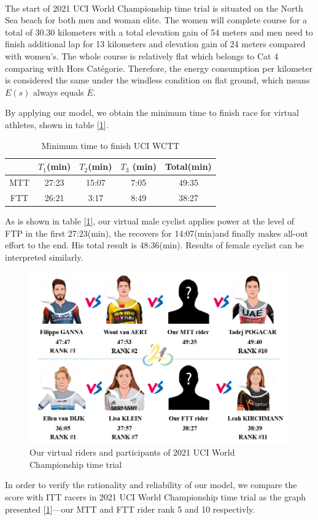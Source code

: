 \paragraph{} The start of 2021 UCI World Championship time trial is situated on the North Sea beach for both men and woman elite. The women will complete course for a total of 30.30 kilometers with a total elevation gain of 54 meters and men need to finish additional lap for 13 kilometers and elevation gain of 24 meters compared with women's. The whole course is relatively flat which belongs to Cat 4 comparing with Hors Catégorie. Therefore, the energy consumption per kilometer is considered the same under the windless condition on flat ground, which means $E(s)$ always equals $\overline{E}$.
\par By applying our model, we obtain the minimum time to finish race for virtual athletes, shown in table [\ref{time2}].
\begin{table}[h]
	\setlength{\belowcaptionskip}{0.2cm}
	\setlength\tabcolsep{16pt}%
	\centering
	\caption{ Minimum time to finish UCI WCTT}
	\begin{tabular}{ccccc}
		\toprule[2pt]
		&$ T_1$(min)    & $T_2$(min)    & $T_3$ (min)   & Total(min) \\
		\midrule
		MTT   & 27:23 & 15:07 & 7:05  & 49:35 \\
		FTT   & 26:21 & 3:17  & 8:49  & 38:27 \\
		\bottomrule[2pt]
	\end{tabular}%
	\label{time2}%
\end{table}%

\par As is shown in table [\ref{time2}], our virtual male cyclist applies power at the level of FTP in the first 27:23(min), the recovers for 14:07(min)and finally makes all-out effort to the end. His total result is 48:36(min). Results of female cyclist can be interpreted similarly.
\begin{figure}[h]
	\centering
	\includegraphics[width=0.9\linewidth]{image/rider1}
	\caption{Our virtual riders and participants of 2021 UCI World Championship time trial}
	\label{rider1}
\end{figure}
\par In order to verify the rationality and reliability of our model, we compare the score with ITT racers in 2021 UCI World Championship time trial as the graph presented [\ref{rider1}]---our MTT and FTT rider rank 5 and 10 respectivly.
